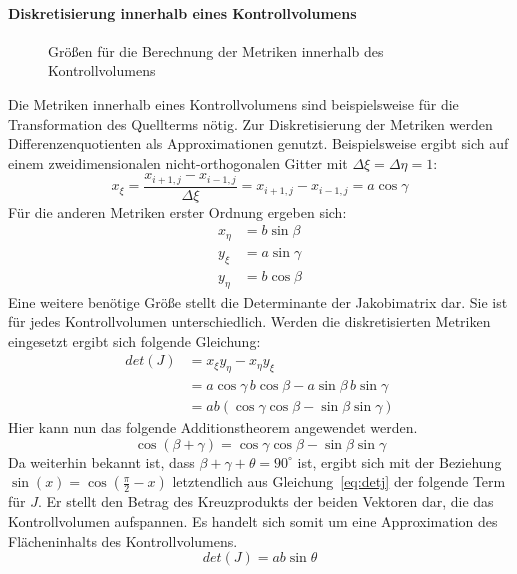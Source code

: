 \paragraph{Diskretisierung innerhalb eines Kontrollvolumens}
\begin{figure}[ht]
  
\centering
\caption{Größen für die Berechnung der Metriken innerhalb des Kontrollvolumens}
\end{figure}
Die Metriken innerhalb eines Kontrollvolumens sind beispielsweise für die Transformation
des Quellterms nötig. Zur Diskretisierung der Metriken werden
Differenzenquotienten als Approximationen genutzt\cite{lee}.
Beispielsweise ergibt sich auf einem zweidimensionalen nicht-orthogonalen
Gitter mit $\Delta\xi = \Delta \eta = 1$:
\begin{equation}
  x_{\xi} = \frac{x_{i+1, j} - x_{i-1,j}}{\Delta \xi} = x_{i+1, j} - x_{i-1,j} = a \cos \gamma
\end{equation}
Für die anderen Metriken erster Ordnung ergeben sich:
\begin{align*}
  x_{\eta} &= b\sin \beta\\
  y_{\xi} &= a \sin \gamma\\
  y_{\eta} &= b \cos \beta
\end{align*}
Eine weitere benötige Größe stellt die Determinante der Jakobimatrix
dar. Sie ist für jedes Kon\-troll\-volumen unterschiedlich. Werden
die diskretisierten Metriken eingesetzt ergibt sich folgende Gleichung:
\begin{align}
  det(J) &= x_{\xi}y_{\eta}-x_{\eta}y_{\xi}\nonumber\\
    &= a \cos \gamma \, b \cos \beta - 
       a \sin \beta \, b \sin \gamma\nonumber\\
       &= ab(\cos\gamma\cos\beta-\sin\beta\sin\gamma)
\end{align}
Hier kann nun das folgende Additionstheorem
angewendet werden.
\begin{equation*}
\cos(\beta+\gamma)=\cos\gamma\cos\beta-\sin\beta\sin\gamma
\end{equation*}
Da weiterhin bekannt ist, dass $\beta+\gamma
+\theta = 90^{\circ}$ ist, ergibt sich mit der Beziehung
$\sin(x)=\cos(\frac{\pi}{2} -x)$ letztendlich aus
Gleichung~\eqref{eq:detj} der folgende Term für $J$. Er stellt den Betrag des
Kreuzprodukts der beiden
Vektoren dar,
die das Kontrollvolumen aufspannen.
Es handelt sich somit um eine Approximation des Flächeninhalts
des Kontrollvolumens.
\begin{equation}
  det(J) = a b \sin \theta
\end{equation}

